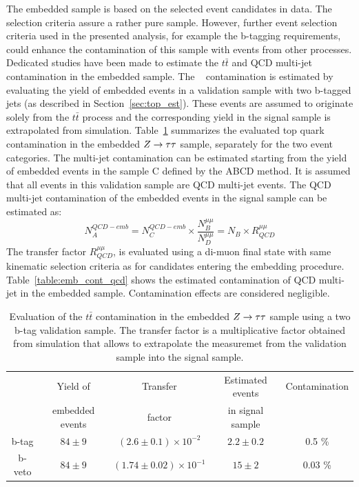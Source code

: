 The embedded sample is based on the selected \Zmumu event candidates in data. The \Zmumu selection criteria 
assure a rather pure \Zmumu sample. However, further event selection criteria used in the presented analysis, 
for example the b-tagging requirements, could enhance the contamination of this sample with events  from other processes. 
Dedicated studies have been made to estimate the $t\bar{t}$ and QCD multi-jet contamination in the embedded sample.
The \ttbar~ contamination is estimated by evaluating the yield of embedded \Ztt events in a validation sample with two b-tagged jets
(as described in Section~\ref{sec:top_est}). These events are assumed to originate solely from the $t\bar{t}$ process
and the corresponding yield in the signal sample is extrapolated from simulation.
Table~\ref{table:emb_cont_tt} summarizes the evaluated top quark contamination in the embedded $Z\rightarrow \tau\tau$ sample, separately for the two event categories.
The multi-jet contamination can be estimated starting 
from the yield of embedded events in the sample C defined by the ABCD method.
It is assumed that all events in this validation sample are QCD multi-jet events. The QCD multi-jet contamination 
of the embedded events in the  signal sample 
can be estimated as:
\begin{equation} \label{eqn:qcdEmb}
N_{A}^{QCD-emb}  = N_{C}^{QCD-emb} \times \frac{N_{B}^{\mu\mu}}{N_{D}^{\mu\mu}} =  N_{B} \times R_{QCD}^{\mu\mu}
\end{equation}
The transfer factor $R_{QCD}^{\mu\mu}$, is evaluated using a di-muon final state with same kinematic selection criteria
 as for \Zmumu candidates entering the embedding procedure.
Table~\ref{table:emb_cont_qcd} shows the estimated contamination of QCD multi-jet in the embedded sample.  
Contamination effects are considered negligible.


\begin{table} [tp]
\begin{small}
\centering
\begin{tabular}{c c c c c}
\hline
\hline
 & Yield of 		& Transfer	& Estimated events	& Contamination \\
 & embedded events	& factor	& in signal sample	&	\\		 [0.5ex]
\hline
b-tag & $84 \pm 9$  & $(2.6 \pm 0.1) \times 10^{-2}$ &  $2.2 \pm 0.2$&  0.5 \% \\
b-veto & $84 \pm 9$ & $(1.74 \pm 0.02) \times 10^{-1}$ & $15 \pm 2$ & 0.03 \% \\[1ex]
\hline
\end{tabular}
\end{small}
\caption{Evaluation of the $t\bar{t}$ contamination  in the embedded $Z\rightarrow \tau\tau$ sample using a two b-tag validation sample. 
The transfer factor is a multiplicative factor obtained from simulation that allows to extrapolate
the measuremet from the validation sample into the signal sample. }
\label{table:emb_cont_tt}
\end{table}

